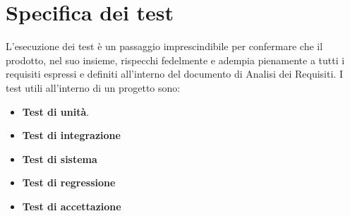 \section{Specifica dei test}
L'esecuzione dei test è un passaggio imprescindibile per confermare che il prodotto, nel suo insieme, rispecchi fedelmente e adempia pienamente a tutti i requisiti espressi e definiti all'interno del documento di Analisi dei Requisiti. I test utili all'interno di un progetto sono:
\begin{itemize}
    \item \textbf{Test di unità}.
    \item \textbf{Test di integrazione}
    \item \textbf{Test di sistema}
    \item \textbf{Test di regressione}
    \item \textbf{Test di accettazione}
\end{itemize}




